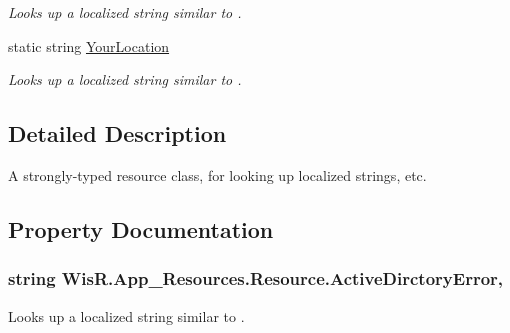 \begin{DoxyCompactItemize}
\begin{DoxyCompactList}\small\item\em Looks up a localized string similar to . \end{DoxyCompactList}\item 
static string \hyperlink{class_wis_r_1_1_app___resources_1_1_resource_a88d257b40e35629d310c7f0314550b1a}{Your\+Location}
\begin{DoxyCompactList}\small\item\em Looks up a localized string similar to . \end{DoxyCompactList}\end{DoxyCompactItemize}


\subsection{Detailed Description}
A strongly-\/typed resource class, for looking up localized strings, etc. 



\subsection{Property Documentation}
\hypertarget{class_wis_r_1_1_app___resources_1_1_resource_afbd1ce87e8ee26db26dd7b24e50d75cc}{}
\subsubsection[{Active\+Dirctory\+Error}]{\setlength{\rightskip}{0pt plus 5cm}string Wis\+R.\+App\+\_\+\+Resources.\+Resource.\+Active\+Dirctory\+Error\hspace{0.3cm}{\ttfamily [static]}, {\ttfamily [get]}}\label{class_wis_r_1_1_app___resources_1_1_resource_afbd1ce87e8ee26db26dd7b24e50d75cc}


Looks up a localized string similar to . 

\hypertarget{class_wis_r_1_1_app___resources_1_1_resource_abf6298cbd85c0ceaabba51b2a1195207}{}
